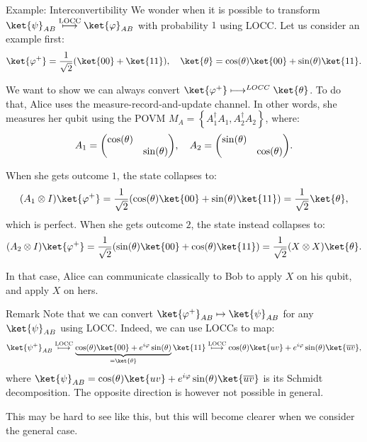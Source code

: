 \documentclass[a4paper]{article}
\begin{document}
\begin{parag}{Example: Interconvertibility}
    We wonder when it is possible to transform $\ket{\psi}_{AB} \over{\longmapsto}{LOCC}  \ket{\phi}_{AB}$ with probability $1$ using LOCC. Let us consider an example first: 
    \[\ket{\phi^+} = \frac{1}{\sqrt{2}}\left(\ket{00} + \ket{11}\right), \mathspace \ket{\theta} = \cos\left(\theta\right) \ket{00} + \sin\left(\theta\right) \ket{11}.\]

    We want to show we can always convert $\ket{\phi^+} \longmapsto^{LOCC} \ket{\theta}$. To do that, Alice uses the measure-record-and-update channel. In other words, she measures her qubit using the POVM $M_A = \left\{A_1^{\dagger} A_1, A_2^{\dagger} A_2\right\}$, where: 
    \[A_1 = \begin{pmatrix} \cos\left(\theta\right) &  \\  & \sin\left(\theta\right) \end{pmatrix}, \mathspace A_2 = \begin{pmatrix} \sin\left(\theta\right) &  \\  & \cos\left(\theta\right) \end{pmatrix}.\]

    When she gets outcome $1$, the state collapses to: 
    \[\left(A_1 \otimes I\right) \ket{\phi^+} = \frac{1}{\sqrt{2}} \left(\cos\left(\theta\right) \ket{00} + \sin\left(\theta\right) \ket{11}\right) = \frac{1}{\sqrt{2}} \ket{\theta},\]
    which is perfect. When she gets outcome $2$, the state instead collapses to:
    \[\left(A_2 \otimes I\right) \ket{\phi^+} = \frac{1}{\sqrt{2}}\left(\sin\left(\theta\right) \ket{00} + \cos\left(\theta\right) \ket{11}\right) = \frac{1}{\sqrt{2}} \left(X \otimes X\right) \ket{\theta}.\]

    In that case, Alice can communicate classically to Bob to apply $X$ on his qubit, and apply $X$ on hers.

    \begin{subparag}{Remark}
        Note that we can convert $\ket{\phi^+}_{AB} \mapsto \ket{\psi}_{AB}$ for any $\ket{\psi}_{AB}$ using LOCC. Indeed, we can use LOCCs to map:
        \[\ket{\psi^+}_{AB} \over{\longmapsto}{LOCC} \underbrace{\cos\left(\theta\right) \ket{00} + e^{i\phi} \sin\left(\theta\right)}_{= \ket{\theta}} \ket{11} \over{\longmapsto}{LOCC}  \cos\left(\theta\right) \ket{uv} + e^{i \phi} \sin\left(\theta\right) \ket{\bar{u} \bar{v}},\]
        where $\ket{\psi}_{AB} = \cos\left(\theta\right) \ket{uv} + e^{i \phi} \sin\left(\theta\right) \ket{\bar{u} \bar{v}}$ is its Schmidt decomposition. The opposite direction is however not possible in general. 

        This may be hard to see like this, but this will become clearer when we consider the general case.
    \end{subparag}
\end{parag}
\end{document}
